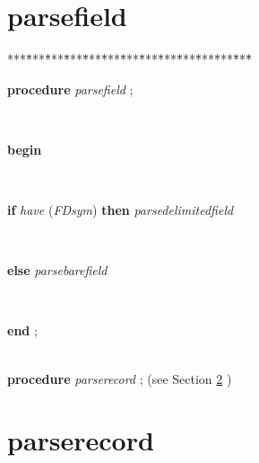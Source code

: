 \section{parsefield}\label{sec:csvfilereader/getdatamatrix/recursedown/recurse/getcolheaders/recurse/getrowheaders/recurse/colcount/getcell/removetrailingnull/onlynulls/rowcount/isint/printcsv/parsecsvfile/thetoken/peek/isoneof/nextsymbol/have/haveoneof/initialise/resolvealpha/resolvedigits/resolvetoken/markbegin/markend/setalpha/emptyfield/parsebarefield/parsedelimitedfield/appendcurrentcharparsefield}

\begin{tabbing}
***\=***\=***\=***\=***\=***\=***\=***\=***\=***\=***\=***\=***\=\kill
\parbox{14cm}{\textsf{\textbf{procedure}  \textit{parsefield} ;}}\\
\+\parbox{14cm}{\textsf{\textbf{begin} }}\\
\+\parbox{14cm}{\textsf {\textbf {if } \textsf{\textit{have} (\textit{FDsym})} \textbf{ then } \textsf{\textit{parsedelimitedfield}}}}\\
\<\parbox{14cm}{\textsf {\textbf {else } \textsf{\textit{parsebarefield}}}}\\
\<\-\<\-\parbox{14cm}{\textsf{\textbf{end} ;}}\\
\+\textsf{\textbf{procedure}  \textit{parserecord} ;} (see Section \ref{sec:csvfilereader/getdatamatrix/recursedown/recurse/getcolheaders/recurse/getrowheaders/recurse/colcount/getcell/removetrailingnull/onlynulls/rowcount/isint/printcsv/parsecsvfile/thetoken/peek/isoneof/nextsymbol/have/haveoneof/initialise/resolvealpha/resolvedigits/resolvetoken/markbegin/markend/setalpha/emptyfield/parsebarefield/parsedelimitedfield/appendcurrentchar/parsefieldparserecord} )\\
\end{tabbing}
\section{parserecord}\label{sec:csvfilereader/getdatamatrix/recursedown/recurse/getcolheaders/recurse/getrowheaders/recurse/colcount/getcell/removetrailingnull/onlynulls/rowcount/isint/printcsv/parsecsvfile/thetoken/peek/isoneof/nextsymbol/have/haveoneof/initialise/resolvealpha/resolvedigits/resolvetoken/markbegin/markend/setalpha/emptyfield/parsebarefield/parsedelimitedfield/appendcurrentchar/parsefieldparserecord}

